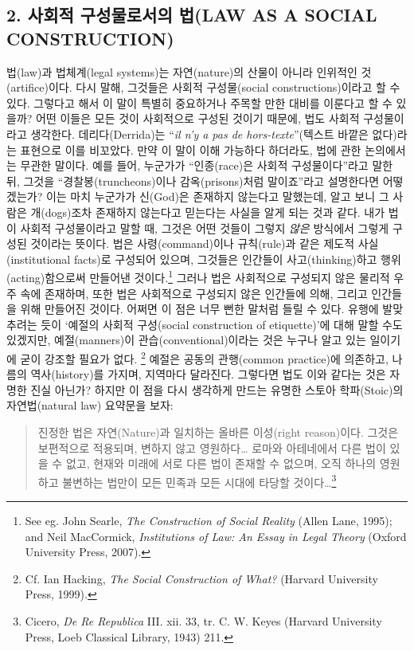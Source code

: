 \documentclass[12pt, oneside]{book}  %
\begin{document}
\subsection{\texorpdfstring{\textbf{2. 사회적 구성물로서의 법(LAW AS A
SOCIAL
CONSTRUCTION)}}{2. 사회적 구성물로서의 법(LAW AS A SOCIAL CONSTRUCTION)}}\label{uxc0acuxd68cuxc801-uxad6cuxc131uxbb3cuxb85cuxc11cuxc758-uxbc95law-as-a-social-construction}

법(law)과 법체계(legal systems)는 자연(nature)의 산물이 아니라 인위적인
것(artifice)이다. 다시 말해, 그것들은 사회적 구성물(social
constructions)이라고 할 수 있다. 그렇다고 해서 이 말이 특별히 중요하거나
주목할 만한 대비를 이룬다고 할 수 있을까? 어떤 이들은 모든 것이
사회적으로 구성된 것이기 때문에, 법도 사회적 구성물이라고 생각한다.
데리다(Derrida)는 ``\emph{il n'y a pas de hors-texte}''(텍스트 바깥은
없다)라는 표현으로 이를 비꼬았다. 만약 이 말이 이해 가능하다 하더라도,
법에 관한 논의에서는 무관한 말이다. 예를 들어, 누군가가 ``인종(race)은
사회적 구성물이다''라고 말한 뒤, 그것을 ``경찰봉(truncheons)이나
감옥(prisons)처럼 말이죠''라고 설명한다면 어떻겠는가? 이는 마치 누군가가
신(God)은 존재하지 않는다고 말했는데, 알고 보니 그 사람은 개(dogs)조차
존재하지 않는다고 믿는다는 사실을 알게 되는 것과 같다. 내가 법이 사회적
구성물이라고 말할 때, 그것은 어떤 것들이 그렇지 \emph{않은} 방식에서
그렇게 구성된 것이라는 뜻이다. 법은 사령(command)이나 규칙(rule)과 같은
제도적 사실(institutional facts)로 구성되어 있으며, 그것들은 인간들이
사고(thinking)하고 행위(acting)함으로써 만들어낸 것이다.\footnote{See
  eg. John Searle, \emph{The Construction of Social Reality} (Allen
  Lane, 1995); and Neil MacCormick, \emph{Institutions of Law: An Essay
  in Legal Theory} (Oxford University Press, 2007).} 그러나 법은
사회적으로 구성되지 않은 물리적 우주 속에 존재하며, 또한 법은 사회적으로
구성되지 않은 인간들에 의해, 그리고 인간들을 위해 만들어진 것이다.
어쩌면 이 점은 너무 뻔한 말처럼 들릴 수 있다. 유행에 발맞추려는 듯이
`예절의 사회적 구성(social construction of etiquette)'에 대해 말할 수도
있겠지만, 예절(manners)이 관습(conventional)이라는 것은 누구나 알고 있는
일이기에 굳이 강조할 필요가 없다. \footnote{Cf. Ian Hacking, \emph{The
  Social Construction of What?} (Harvard University Press, 1999).}
예절은 공동의 관행(common practice)에 의존하고, 나름의 역사(history)를
가지며, 지역마다 달라진다. 그렇다면 법도 이와 같다는 것은 자명한 진실
아닌가? 하지만 이 점을 다시 생각하게 만드는 유명한 스토아 학파(Stoic)의
자연법(natural law) 요약문을 보자:

\begin{quote}
진정한 법은 자연(Nature)과 일치하는 올바른 이성(right reason)이다.
그것은 보편적으로 적용되며, 변하지 않고 영원하다\ldots{} 로마와
아테네에서 다른 법이 있을 수 없고, 현재와 미래에 서로 다른 법이 존재할
수 없으며, 오직 하나의 영원하고 불변하는 법만이 모든 민족과 모든 시대에
타당할 것이다\ldots{}\footnote{Cicero, \emph{De Re Republica} III. xii.
  33, tr. C. W. Keyes (Harvard University Press, Loeb Classical Library,
  1943) 211.}
\end{quote}
\end{document}
